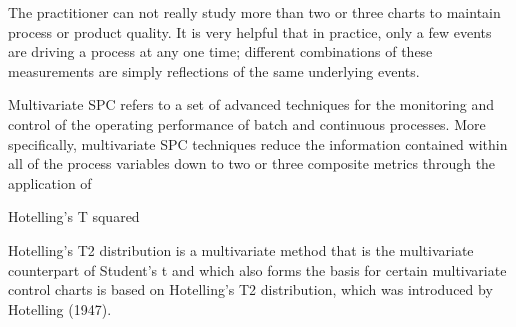 
The practitioner can not really study more than two or three charts to maintain process or product quality. It is very
helpful that in practice, only a few events are driving a process at any one time; different combinations of these
measurements are simply reflections of the same underlying events. 


Multivariate SPC refers to a set of advanced techniques for the monitoring and control of the operating performance
of batch and continuous processes. More specifically, multivariate SPC techniques reduce the information
contained within all of the process variables down to two or three composite metrics through the application of

Hotelling's T squared

Hotelling's T2 distribution is a multivariate method that is the multivariate counterpart of Student's t and which also forms the basis for certain multivariate control charts is based on Hotelling's T2 distribution, which was introduced by Hotelling (1947).

